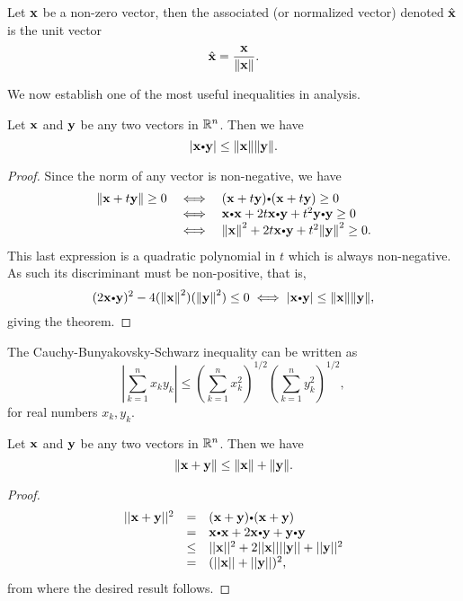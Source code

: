 \begin{df} Let $\mathbf{ x}$ be  a non-zero vector, then the associated 
   (or normalized vector)  denoted $\hat {\mathbf{ x}}$  is the unit vector 
 \[ \hat{\mathbf{ x}}=\dfrac{\mathbf{ x}}{{\left\|\mathbf{ x}\right\|}}.\]
\end{df}




We now establish one of the most useful inequalities in analysis.
\begin{thm} Let
$\mathbf{ x}$ and $\mathbf{ y}$  be any two vectors in $\mathbb{R}^n$.
Then we have
$$
 |\dotprod{x}{y}| \leq \norm{\vector{x}}\norm{\vector{y}} .$$\label{thm:cauchy_schwarz}
\end{thm}
\begin{proof}
Since the norm of any vector is non-negative, we have $$
\begin{array}{lll} \norm{\vector{x} + t\vector{y}} \geq 0 & \iff &
(\vector{x} + t\vector{y})\bp (\vector{x} +t\vector{y}) \geq 0 \\ &
\iff & \dotprod{x}{x} + 2t\dotprod{x}{y} + t^2\dotprod{y}{y} \geq 0
\\ & \iff & \norm{\vector{x}}^2 + 2t\dotprod{x}{y} +
t^2\norm{\vector{y}}^2 \geq 0.
\end{array}$$ This last expression is a quadratic polynomial in
$t$ which is always non-negative. As such its discriminant must be
non-positive, that is, $$ (2\dotprod{x}{y})^2 -
4(\norm{\vector{x}}^2)(\norm{\vector{y}}^2) \leq 0 \iff
|\dotprod{x}{y}| \leq \norm{\vector{x}}\norm{\vector{y}} ,
$$giving the theorem.
\end{proof}


The Cauchy-Bunyakovsky-Schwarz inequality can be written as
\begin{equation} \left|\sum _{k = 1} ^n x_k y_k \right| \leq
\left(\sum _{k = 1} ^nx_k ^2\right)^{1/2} \left(\sum _{k = 1} ^ny_k
^2\right)^{1/2}, \label{eq:cbs_sum_form}\end{equation} for real
numbers $x_k, y_k$.


\begin{thm} Let
$\mathbf{ x}$ and $\mathbf{ y}$ be  any two vectors in $\mathbb{R}^n$.
Then we have
$${\left\|\mathbf{ x} + \mathbf{ y}\right\|} \leq {\left\|\mathbf{ x}\right\|} + {\left\|\mathbf{ y}\right\|}.$$
\label{defdesitriangular}
\end{thm}
\begin{proof}
$$\begin{array}{lll}
||\vector{x} + \vector{y}||^2 & = & (\vector{x} + \vector{y})\bp (\vector{x} + \vector{y}) \\
& = & \vector{x}\bp\vector{x} + 2\vector{x}\bp\vector{y} +
\vector{y}\bp\vector{y} \\
& \leq & ||\vector{x}||^2  + 2||\vector{x}||||\vector{y}|| +
||\vector{y}||^2 \\
& = & (||\vector{x}|| + ||\vector{y}||)^2,
\end{array}$$from where the desired result follows.
\end{proof}

